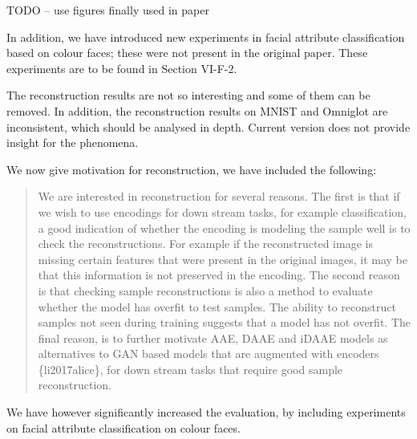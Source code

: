 \documentclass{article}
\begin{document}
{\color{red} TODO -- use figures finally used in paper}

\begin{figure}

\end{figure}


In addition, we have introduced new experiments in facial {\color{red} attribute} classification based on colour faces; these were not present in the original paper.  These experiments are to be found in {\color{red} Section VI-F-2}.

{\color{blue}
The reconstruction results are not so interesting and some of them can be removed. In addition, the reconstruction results on MNIST and Omniglot are inconsistent, which should be analysed in depth. Current version does not provide insight for the phenomena.}\\

{\color{red} 
We now give motivation for reconstruction, we have included the following:

\begin{quote}
We are interested in reconstruction for several reasons. The first is that if we wish to use encodings for down stream tasks, for example classification, a good indication of whether the encoding is modeling the sample well is to check the reconstructions. For example if the reconstructed image is missing certain features that were present in the original images, it may be that this information is not preserved in the encoding. The second reason is that checking sample reconstructions is also a method to evaluate whether the model has overfit to test samples. The ability to reconstruct samples not seen during training suggests that a model has not overfit. The final reason, is to further motivate AAE, DAAE and iDAAE models as alternatives to GAN based models that are augmented with encoders \{li2017alice\}, for down stream tasks that require good sample reconstruction.
\end{quote}

We have however significantly increased the evaluation, by including experiments on facial attribute classification on colour faces.
}
\end{document}
